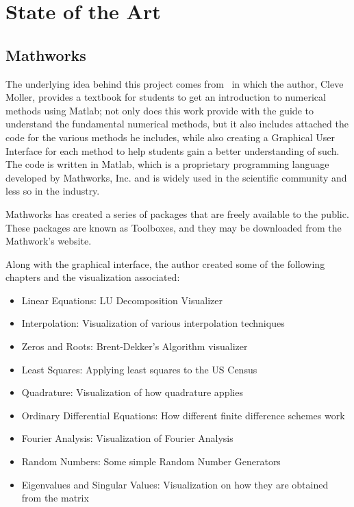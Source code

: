 \chapter{State of the Art}
\section{Mathworks}
The underlying idea behind this project comes from~\cite{doi:10.1137/1.9780898717952} in which the author, Cleve Moller, provides a textbook for students to get an introduction to numerical methods using Matlab; not only does this work provide with the guide to understand the fundamental numerical methods, but it also includes attached the code for the various methods he includes, while also creating a Graphical User Interface for each method to help students gain a better understanding of such. The code is written in Matlab, which is a proprietary programming language developed by Mathworks, Inc. and is widely used in the scientific community and less so in the industry.

Mathworks has created a series of packages that are freely available to the public. These packages are known as Toolboxes, and they may be downloaded from the Mathwork's website. 

Along with the graphical interface, the author created some of the following chapters and the visualization associated:
\begin{itemize}
    \item Linear Equations: LU Decomposition Visualizer
    \item Interpolation: Visualization of various interpolation techniques
    \item Zeros and Roots: Brent-Dekker's Algorithm visualizer
    \item Least Squares: Applying least squares to the US Census 
    \item Quadrature: Visualization of how quadrature applies
    \item Ordinary Differential Equations: How different finite difference schemes work
    \item Fourier Analysis: Visualization of Fourier Analysis
    \item Random Numbers: Some simple Random Number Generators
    \item Eigenvalues and Singular Values: Visualization on how they are obtained from the matrix
\end{itemize}



